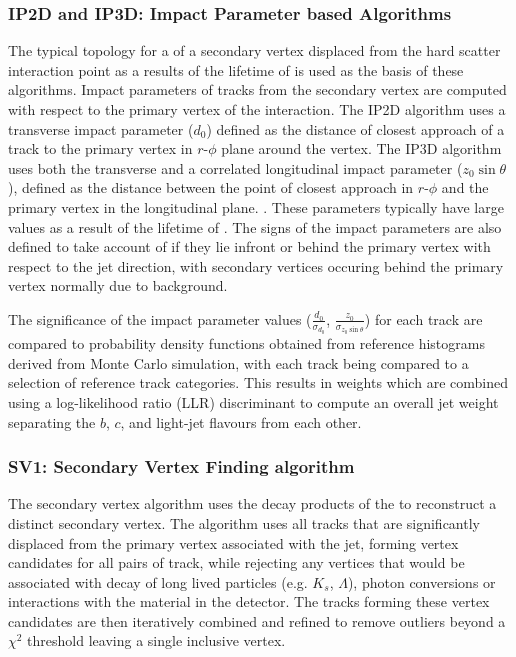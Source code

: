 	\subsubsection{IP2D and IP3D: Impact Parameter based Algorithms}
		\label{det:btag:ip}
		
		The typical topology for a \bhadron of a secondary vertex displaced from the hard scatter interaction point as a results of the lifetime of \bquark is used as the basis of these algorithms. Impact parameters of tracks from the secondary vertex are computed with respect to the primary vertex of the interaction. The IP2D algorithm uses a transverse impact parameter ($d_0$) defined as the distance of closest approach of a track to the  primary vertex in $r$-$\phi$ plane around the vertex. The IP3D algorithm uses both the transverse and a correlated longitudinal impact parameter ($z_0\sin\theta$), defined as the distance between the point of closest approach in $r$-$\phi$ and the primary vertex in the longitudinal plane. . These parameters typically have large values as a result of the lifetime of \bquark. The signs of the impact parameters are also defined to take account of if they lie infront or behind the primary vertex with respect to the jet direction, with secondary vertices occuring behind the primary vertex normally due to background.
		
		The significance of the impact parameter values ($\frac{d_0}{\sigma_{d_0}}$, $\frac{z_0}{\sigma_{z_0\sin\theta}}$) for each track are compared to probability density functions obtained from reference histograms derived from Monte Carlo simulation, with each track being compared to a selection of reference track categories. This results in weights which are combined using a log-likelihood ratio (LLR) discriminant to compute an overall jet weight separating the $b$, $c$, and light-jet flavours from each other. \cite{btagOptimisation, bTagPerformance}
		
	\subsubsection{SV1: Secondary Vertex Finding algorithm}
	\label{det:btag:sv}
	
		The secondary vertex algorithm uses the decay products of the \bhadron to reconstruct a distinct secondary vertex. The algorithm uses all tracks that are significantly displaced from the primary vertex associated with the jet, forming vertex candidates for all pairs of track, while rejecting any vertices that would be associated with decay of long lived particles (e.g. $K_s$, $\Lambda$), photon conversions or interactions with the material in the detector. The tracks forming these vertex candidates are then iteratively combined and refined to remove outliers beyond a $\chi^2$ threshold leaving a single inclusive vertex.
		

